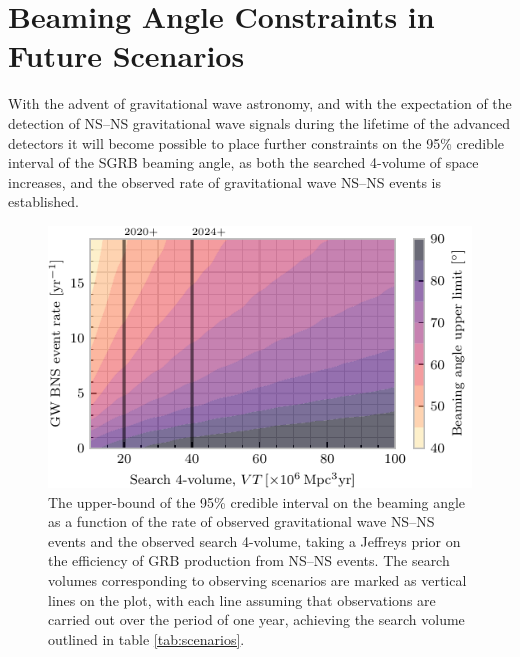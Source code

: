 \documentclass[twocolumn]{aastex61}
\newcommand{\BNS}{\ac{NS}--\ac{NS}\xspace}
\begin{document}
\section{Beaming Angle Constraints in Future Scenarios}
\label{sec:future}
With the advent of gravitational wave astronomy, and with the
expectation of the detection of \BNS gravitational wave signals during
the lifetime of the advanced detectors it will become possible to
place further constraints on the 95\% credible interval of the SGRB
beaming angle, as both the searched 4-volume of space increases, and
the observed rate of gravitational wave \BNS events is established.

\begin{figure}
\centering
\includegraphics[width=\linewidth]{volume_v_nevents.pdf}
\caption{\label{fig:volumevevents} The upper-bound of the 95\%
  credible interval on the beaming angle as a function of the rate of
  observed gravitational wave \BNS events and the observed search
  4-volume, taking a Jeffreys prior on the efficiency of \ac{GRB}
  production from \BNS{} events. The search volumes corresponding to
  observing scenarios are marked as vertical lines on the plot, with
  each line assuming that observations are carried out over the period
  of one year, achieving the search volume outlined in table
  \ref{tab:scenarios}.}
\end{figure}
\end{document}
